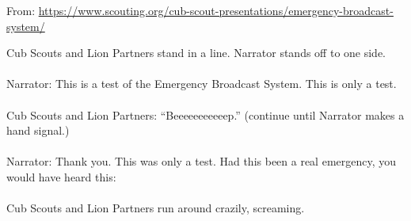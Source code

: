 
From: \url{https://www.scouting.org/cub-scout-presentations/emergency-broadcast-system/}

Cub Scouts and Lion Partners stand in a line.  Narrator stands off to one side.\\
\\
Narrator: This is a test of the Emergency Broadcast System.  This is only a test.\\
\\
Cub Scouts and Lion Partners: “Beeeeeeeeeeep.” (continue until Narrator makes a hand signal.)\\
\\
Narrator: Thank you.  This was only a test.  Had this been a real emergency, you would have heard this:\\
\\
Cub Scouts and Lion Partners run around crazily, screaming.\\
